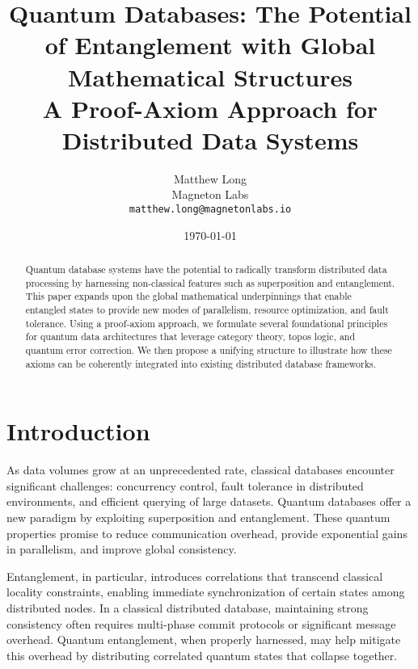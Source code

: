 \documentclass[12pt]{article}
\theoremstyle{definition}
\theoremstyle{remark}
\begin{document}
\title{\textbf{Quantum Databases: The Potential of Entanglement with Global Mathematical Structures}\\
\large A Proof-Axiom Approach for Distributed Data Systems}

\author{Matthew Long \\
Magneton Labs \\
\texttt{matthew.long@magnetonlabs.io}}

\date{\today}

\maketitle

\begin{abstract}
Quantum database systems have the potential to radically transform distributed data processing by harnessing non-classical features such as superposition and entanglement. This paper expands upon the global mathematical underpinnings that enable entangled states to provide new modes of parallelism, resource optimization, and fault tolerance. Using a proof-axiom approach, we formulate several foundational principles for quantum data architectures that leverage category theory, topos logic, and quantum error correction. We then propose a unifying structure to illustrate how these axioms can be coherently integrated into existing distributed database frameworks. 
\end{abstract}

\tableofcontents

\section{Introduction}
As data volumes grow at an unprecedented rate, classical databases encounter significant challenges: concurrency control, fault tolerance in distributed environments, and efficient querying of large datasets. Quantum databases offer a new paradigm by exploiting superposition and entanglement. These quantum properties promise to reduce communication overhead, provide exponential gains in parallelism, and improve global consistency. 

Entanglement, in particular, introduces correlations that transcend classical locality constraints, enabling immediate synchronization of certain states among distributed nodes. In a classical distributed database, maintaining strong consistency often requires multi-phase commit protocols or significant message overhead. Quantum entanglement, when properly harnessed, may help mitigate this overhead by distributing correlated quantum states that collapse together.
\end{document}
